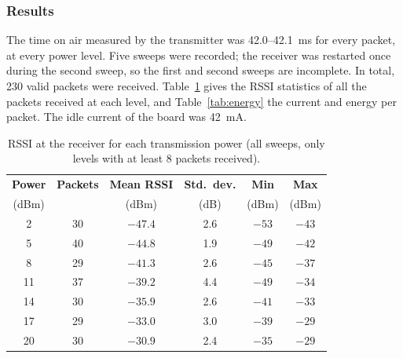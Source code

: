 \documentclass[informe,english]{plantilla}
\begin{document}
\subsubsection{Results}

The time on air measured by the transmitter was 42.0--42.1~ms for every
packet, at every power level. Five sweeps were recorded; the receiver was
restarted once during the second sweep, so the first and second sweeps are
incomplete. In total, 230 valid packets were received. Table~\ref{tab:rssi}
gives the RSSI statistics of all the packets received at each level, and
Table~\ref{tab:energy} the current and energy per packet. The idle current of
the board was 42~mA.

\begin{table}[h]
    \centering
    \begin{tabular}{@{}cccccc@{}}
        \toprule
        \textbf{Power} & \textbf{Packets} & \textbf{Mean RSSI} &
        \textbf{Std.\ dev.} & \textbf{Min} & \textbf{Max} \\
        (dBm) & & (dBm) & (dB) & (dBm) & (dBm) \\
        \midrule
        2  & 30 & $-47.4$ & 2.6 & $-53$ & $-43$ \\
        5  & 40 & $-44.8$ & 1.9 & $-49$ & $-42$ \\
        8  & 29 & $-41.3$ & 2.6 & $-45$ & $-37$ \\
        11 & 37 & $-39.2$ & 4.4 & $-49$ & $-34$ \\
        14 & 30 & $-35.9$ & 2.6 & $-41$ & $-33$ \\
        17 & 29 & $-33.0$ & 3.0 & $-39$ & $-29$ \\
        20 & 30 & $-30.9$ & 2.4 & $-35$ & $-29$ \\
        \bottomrule
    \end{tabular}
    \caption{RSSI at the receiver for each transmission power (all sweeps,
             only levels with at least 8 packets received).}
    \label{tab:rssi}
\end{table}
\end{document}
